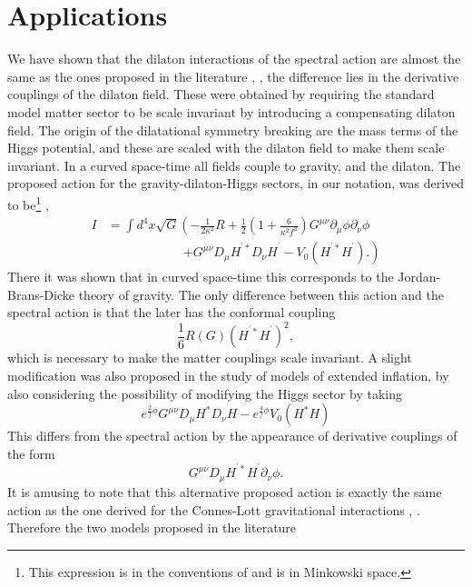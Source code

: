 \documentclass[12pt]{article}%
\begin{document}
\section{\bigskip Applications}

We have shown that the dilaton interactions of the spectral action are almost
the same as the ones proposed in the literature \cite{Bud}, \cite{Bubu}, the
difference lies in the derivative couplings of the dilaton field. These were
obtained by requiring the standard model matter sector to be scale invariant
by introducing a compensating dilaton field. The origin of the dilatational
symmetry breaking are the mass terms of the Higgs potential, and these are
scaled with the dilaton field to make them scale invariant. In a curved
space-time all fields couple to gravity, and the dilaton. The proposed action
for the gravity-dilaton-Higgs sectors, in our notation, was derived to
be\footnote{This expression is in the conventions of \cite{Kolb} and is in
Minkowski space.} \cite{Bubu}, \cite{Kolb}
\begin{align*}
I  &  =%
{\displaystyle\int}
d^{4}x\sqrt{G}\left(  -\frac{1}{2\kappa^{2}}R+\frac{1}{2}\left(  1+\frac
{6}{\kappa^{2}f^{2}}\right)  G^{\mu\nu}\partial_{\mu}\phi\partial_{\nu}%
\phi\right. \\
&  \qquad\qquad\qquad\left.  +G^{\mu\nu}D_{\mu}H^{^{\prime}\ast}D_{\nu
}H^{^{\prime}}-V_{0}\left(  H^{^{\prime}\ast}H^{^{\prime}}\right)  .\right)
\end{align*}
There it was shown that in curved space-time this corresponds to the
Jordan-Brans-Dicke theory of gravity. The only difference between this action
and the spectral action is that the later has the conformal coupling
\[
\frac{1}{6}R(G)\left(  H^{^{\prime}\ast}H^{^{\prime}}\right)  ^{2},
\]
which is necessary to make the matter couplings scale invariant. A slight
modification was also proposed in the study of models of extended inflation,
by also considering the possibility of modifying the Higgs sector by taking
\cite{Kolb}%
\[
e^{\frac{2}{f}\phi}G^{\mu\nu}D_{\mu}H^{\ast}D_{\nu}H-e^{\frac{4}{f}\phi}%
V_{0}\left(  H^{\ast}H\right)
\]
This differs from the spectral action by the appearance of derivative
couplings of the form
\[
G^{\mu\nu}D_{\mu}H^{^{\prime}\ast}H^{^{\prime}}\partial_{\nu}\phi.
\]
It is amusing to note that this alternative proposed action is exactly the
same action as the one derived for the Connes-Lott gravitational interactions
\cite{CFF}, \cite{Lizzi}. Therefore the two models proposed in the literature
\end{document}
